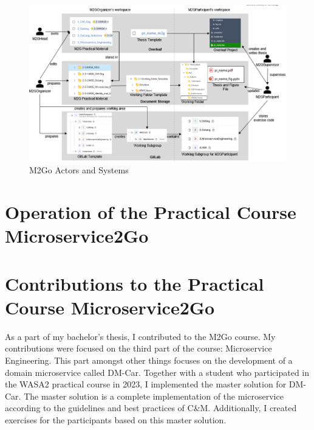 \begin{figure}
	\centering
	\includegraphics[width=\textwidth]{figures/m2go_actors_and_systems.png}
	\caption{M2Go Actors and Systems}
	\label{fig:m2go_actors_and_systems}
\end{figure}


\section{Operation of the Practical Course Microservice2Go}


\section{Contributions to the Practical Course Microservice2Go}


As a part of my bachelor's thesis, I contributed to the M2Go course.
My contributions were focused on the third part of the course: Microservice Engineering.
This part amongst other things focuses on the development of a domain microservice called
DM-Car. Together with a student who participated in the WASA2 practical course in 2023,
I implemented the master solution for DM-Car. The master solution is a complete
implementation of the microservice according to the guidelines and best practices of C\&M.
Additionally, I created exercises for the participants 
based on this master solution.





